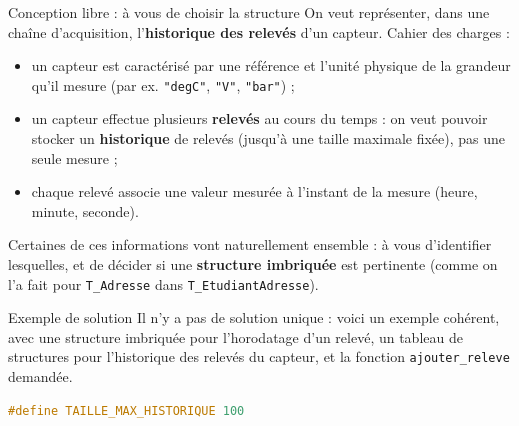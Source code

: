 \begin{UPSTIexercice}{Conception libre : à vous de choisir la structure}
    On veut représenter, dans une chaîne d'acquisition, l'\textbf{historique des relevés} d'un
    capteur. Cahier des charges :
    \begin{itemize}
        \item un capteur est caractérisé par une référence et l'unité physique de la grandeur
            qu'il mesure (par ex. \texttt{"degC"}, \texttt{"V"}, \texttt{"bar"}) ;
        \item un capteur effectue plusieurs \textbf{relevés} au cours du temps : on veut pouvoir
            stocker un \textbf{historique} de relevés (jusqu'à une taille maximale fixée), pas
            une seule mesure ;
        \item chaque relevé associe une valeur mesurée à l'instant de la mesure (heure, minute,
            seconde).
    \end{itemize}


    Certaines de ces informations vont naturellement ensemble : à vous d'identifier lesquelles, et
    de décider si une \textbf{structure imbriquée} est pertinente (comme on l'a fait pour
    \texttt{T\_Adresse} dans \texttt{T\_EtudiantAdresse}).



\begin{UPSTIeleveOnlyEnv}
\end{UPSTIeleveOnlyEnv}

\begin{UPSTIcorrectionP}{Exemple de solution}
    Il n'y a pas de solution unique : voici un exemple cohérent, avec une structure imbriquée pour
    l'horodatage d'un relevé, un tableau de structures pour l'historique des relevés du capteur, et
    la fonction \texttt{ajouter\_releve} demandée.
\begin{lstlisting}[language=c,caption={Exemple de correction}]
#define TAILLE_MAX_HISTORIQUE 100


\end{lstlisting}
\end{UPSTIcorrectionP}
\end{UPSTIexercice}
